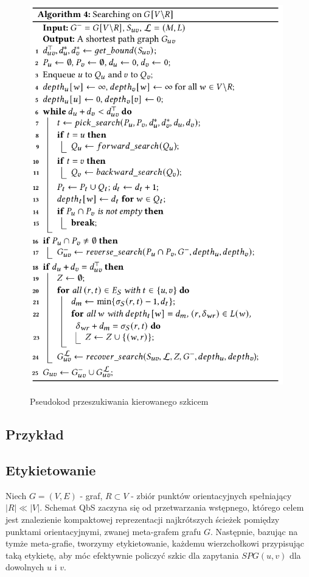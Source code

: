 \documentclass{article}
\theoremstyle{definition}
\begin{document}
    \begin{figure}[!tbh]
        \includegraphics[width=11cm]{img/algorithm_4.png}
        \centering
        \label{fig:alg4}
        \caption{Pseudokod przeszukiwania kierowanego szkicem}
    \end{figure}

    \subsection{Przykład}
     
    \subsection{Etykietowanie}
        Niech $G = (V, E)$ - graf, $R \subset V$ - zbiór punktów orientacyjnych spełniający $|R| \ll |V|$. Schemat QbS zaczyna się od przetwarzania wstępnego, którego celem jest znalezienie kompaktowej reprezentacji najkrótszych ścieżek pomiędzy punktami orientacyjnymi, zwanej meta-grafem grafu $G$. Następnie, bazując na tymże meta-grafie, tworzymy etykietowanie, każdemu wierzchołkowi przypisując taką etykietę, aby móc efektywnie policzyć szkic dla zapytania $SPG(u, v)$  dla dowolnych $u$ i $v$.
\end{document}
